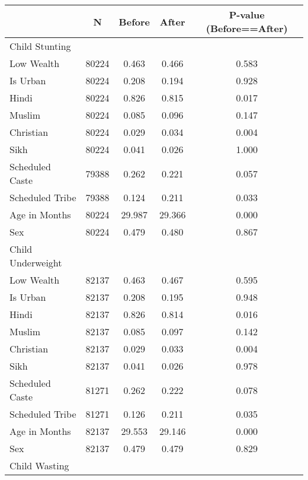 \begin{tabular}{l*{4}{c}}
\hline\hline
            &           N&      Before&       After&P-value (Before==After)\\
\hline
Child Stunting&            &            &            &            \\
Low Wealth  &       80224&       0.463&       0.466&       0.583\\
Is Urban    &       80224&       0.208&       0.194&       0.928\\
Hindi       &       80224&       0.826&       0.815&       0.017\\
Muslim      &       80224&       0.085&       0.096&       0.147\\
Christian   &       80224&       0.029&       0.034&       0.004\\
Sikh        &       80224&       0.041&       0.026&       1.000\\
Scheduled Caste&       79388&       0.262&       0.221&       0.057\\
Scheduled Tribe&       79388&       0.124&       0.211&       0.033\\
Age in Months&       80224&      29.987&      29.366&       0.000\\
Sex         &       80224&       0.479&       0.480&       0.867\\
\hline
Child Underweight&            &            &            &            \\
Low Wealth  &       82137&       0.463&       0.467&       0.595\\
Is Urban    &       82137&       0.208&       0.195&       0.948\\
Hindi       &       82137&       0.826&       0.814&       0.016\\
Muslim      &       82137&       0.085&       0.097&       0.142\\
Christian   &       82137&       0.029&       0.033&       0.004\\
Sikh        &       82137&       0.041&       0.026&       0.978\\
Scheduled Caste&       81271&       0.262&       0.222&       0.078\\
Scheduled Tribe&       81271&       0.126&       0.211&       0.035\\
Age in Months&       82137&      29.553&      29.146&       0.000\\
Sex         &       82137&       0.479&       0.479&       0.829\\
\hline
Child Wasting&            &            &            &            \\

\end{tabular}
